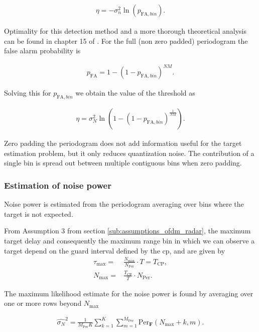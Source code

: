 				\begin{align*}
					\eta = -\sigma_n^2 \ln(p_{\text{FA},bin}) .
				\end{align*} 
				
				Optimality for this detection method and a more thorough theoretical analysis can be found in chapter 15 of \cite{Richards_Scheer_Holm_2010}.
				For the full (non zero padded) periodogram the false alarm probability is
				
				\begin{align*}
					p_\text{FA} = 1 - (1 - p_{\text{FA},bin})^{NM}.
				\end{align*}
				
				Solving this for $p_{\text{FA},bin}$ we obtain the value of the threshold as 
				
				\begin{align*}
					\eta = \sigma_N^2 \ln{(1 - (1 - p_{\text{FA},bin})^{\frac{1}{NM}})}.
				\end{align*}
				
				Zero padding the periodogram does not add information useful for the target estimation problem, but it only reduces quantization noise. The contribution of a single bin is spread out between multiple contiguous bins when zero padding.

				\subsubsection{Estimation of noise power}
	
					Noise power is estimated from the periodogram averaging over bins where the target is not expected.
					
					From Assumption 3 from section \ref{sub:assumptions_ofdm_radar}, the maximum target delay and consequently the maximum range bin in which we can observe a target depend on the guard interval defined by the \gls{cp}, and are given by
					\begin{align*}
						\tau_{\text{max}} =& \frac{N_{\text{max}}}{N_{\text{Per}}}\cdot T = T_\text{CP} ,\\
						N_{\text{max}} =& \frac{T_\text{CP}}{T}\cdot N_{\text{Per}}.
					\end{align*} 
					
					The maximum likelihood estimate for the noise power is found by averaging over one or more rows beyond $N_{\text{max}}$
			
					\begin{align}
					\label{align: threshold_noise_power}
						\hat{\sigma_N}^2 = \frac{1}{M_{\text{Per}}K} \sum_{k=1}^K \sum_{m=1}^{M_{\text{Per}}} \text{Per}_{\bm{F}}(N_{\text{max}}+k, m).
					\end{align}
			
